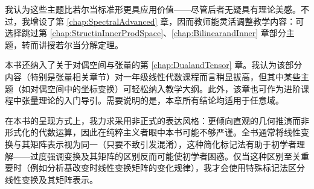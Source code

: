 \begin{preface}
我认为这些主题比若尔当标准形更具应用价值——尽管后者无疑具有理论美感。不过，我增设了第 \ref{chap:SpectralAdvanced} 章，因而教师能灵活调整教学内容：可选择跳过第 \ref{chap:StructinInnerProdSpace}、\ref{chap:BilinearandInner} 章部分主题，转而讲授若尔当分解定理。

本书还纳入了关于对偶空间与张量的第 \ref{chap:DualandTensor} 章。我认为该部分内容（特别是张量相关章节）对一年级线性代数课程而言稍显拔高，但其中某些主题（如对偶空间中的坐标变换）可轻松纳入教学大纲。此外，该章也可作为进阶课程中张量理论的入门导引。需要说明的是，本章所有结论均适用于任意域。

在本书的呈现方式上，我力求采用非正式的表达风格：更倾向直观的几何推演而非形式化的代数运算，因此在纯粹主义者眼中本书可能不够严谨。全书通常将线性变换与其矩阵表示视为同一（只要不致引发混淆），这种简化标记法有助于初学者理解——过度强调变换及其矩阵的区别反而可能使初学者困惑。仅当这种区别至关重要时（例如分析基改变时线性变换矩阵的变化规律），我才会使用特殊标记法区分线性变换及其矩阵表示。

\end{preface}

